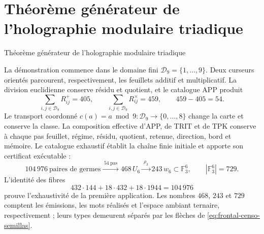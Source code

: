 \chapter*{Théorème générateur de l'holographie modulaire triadique}
%
{Théorème générateur de l'holographie modulaire triadique}

La démonstration commence dans le domaine fini
\(\mathcal D_9=\{1,\ldots,9\}\). Deux curseurs orientés parcourent,
respectivement, les feuillets additif et multiplicatif. La division euclidienne
conserve résidu et quotient, et le catalogue APP produit
\[
 \sum_{i,j\in\mathcal D_9}R^+_{ij}=405,
 \qquad
 \sum_{i,j\in\mathcal D_9}R^\times_{ij}=459,
 \qquad 459-405=54.
\]
Le transport coordonné
\(c(a)=a\bmod9:\mathcal D_9\to\{0,\ldots,8\}\)
change la carte et conserve la classe. La composition effective d'APP, de TRIT et de
TPK conserve à chaque pas feuillet, régime, résidu, quotient, retenue,
direction, bord et mémoire. Le catalogue exhaustif établit la chaîne
finie initiale et apporte son certificat exécutable :
\begin{equation}
\boxed{
104\,976\ \text{paires de germes}
\xrightarrow{\;54\ \text{pas}\;}
468\,U_6
\xrightarrow{\;\rho_3\;}
243\,w_6\subset\mathbb F_3^6,
\qquad |\mathbb F_3^6|=729.}
\label{eq:frontal-censo-semillas}
\end{equation}
L'identité des fibres
\[
432\cdot144+18\cdot432+18\cdot1944=104\,976
\]
prouve l'exhaustivité de la première application. Les nombres \(468\), \(243\) et
\(729\) comptent les émissions, les mots réalisés et l'espace ambiant ternaire,
respectivement ; leurs types demeurent séparés par les flèches de
\eqref{eq:frontal-censo-semillas}.

